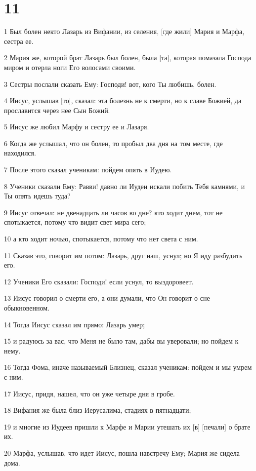\chapter{11}

\par 1 Был болен некто Лазарь из Вифании, из селения, [где жили] Мария и Марфа, сестра ее.
\par 2 Мария же, которой брат Лазарь был болен, была [та], которая помазала Господа миром и отерла ноги Его волосами своими.
\par 3 Сестры послали сказать Ему: Господи! вот, кого Ты любишь, болен.
\par 4 Иисус, услышав [то], сказал: эта болезнь не к смерти, но к славе Божией, да прославится через нее Сын Божий.
\par 5 Иисус же любил Марфу и сестру ее и Лазаря.
\par 6 Когда же услышал, что он болен, то пробыл два дня на том месте, где находился.
\par 7 После этого сказал ученикам: пойдем опять в Иудею.
\par 8 Ученики сказали Ему: Равви! давно ли Иудеи искали побить Тебя камнями, и Ты опять идешь туда?
\par 9 Иисус отвечал: не двенадцать ли часов во дне? кто ходит днем, тот не спотыкается, потому что видит свет мира сего;
\par 10 а кто ходит ночью, спотыкается, потому что нет света с ним.
\par 11 Сказав это, говорит им потом: Лазарь, друг наш, уснул; но Я иду разбудить его.
\par 12 Ученики Его сказали: Господи! если уснул, то выздоровеет.
\par 13 Иисус говорил о смерти его, а они думали, что Он говорит о сне обыкновенном.
\par 14 Тогда Иисус сказал им прямо: Лазарь умер;
\par 15 и радуюсь за вас, что Меня не было там, дабы вы уверовали; но пойдем к нему.
\par 16 Тогда Фома, иначе называемый Близнец, сказал ученикам: пойдем и мы умрем с ним.
\par 17 Иисус, придя, нашел, что он уже четыре дня в гробе.
\par 18 Вифания же была близ Иерусалима, стадиях в пятнадцати;
\par 19 и многие из Иудеев пришли к Марфе и Марии утешать их [в] [печали] о брате их.
\par 20 Марфа, услышав, что идет Иисус, пошла навстречу Ему; Мария же сидела дома.
